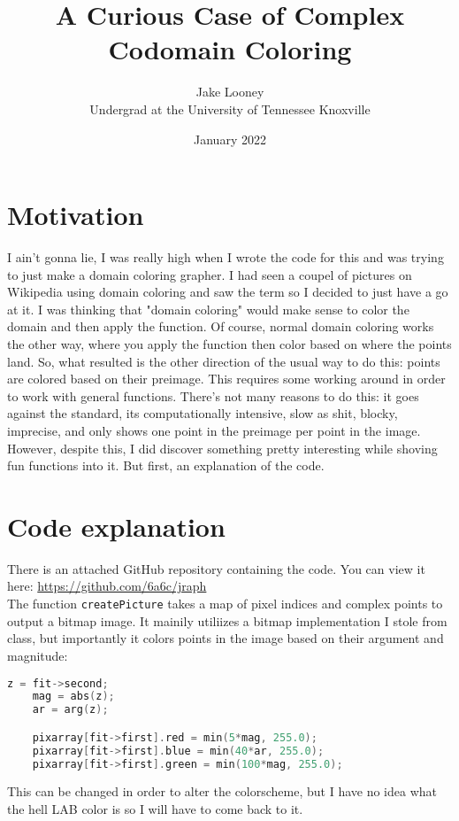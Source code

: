 \documentclass[letterpaper,12pt]{article}
\begin{document}
\title{A Curious Case of Complex Codomain Coloring}
\author{Jake Looney\\ Undergrad at the University of Tennessee Knoxville}
\date{January 2022}
\maketitle

\tableofcontents
\newpage
{}

\section{Motivation}
I ain't gonna lie, I was really high when I wrote the code for this and was trying to just make a domain coloring grapher.
I had seen a coupel of pictures on Wikipedia using domain coloring and saw the term so I decided to just have a go at it.
I was thinking that "domain coloring" would make sense to color the domain and then apply the function.
Of course, normal domain coloring works the other way, where you apply the function then color based on where the points land.
So, what resulted is the other direction of the usual way to do this: points are colored based on their preimage.
This requires some working around in order to work with general functions.
There's not many reasons to do this: it goes against the standard, its computationally intensive, slow as shit, blocky, imprecise, and only shows one point in the preimage per point in the image.
However, despite this, I did discover something pretty interesting while shoving fun functions into it. But first, an explanation of the code.

\section{Code explanation}
There is an attached GitHub repository containing the code. You can view it here: \url{https://github.com/6a6c/jraph} \\

The function \verb|createPicture| takes a map of pixel indices and complex points to output a bitmap image.
It mainily utiliizes a bitmap implementation I stole from class, but importantly it colors points in the image based on their argument and magnitude:
\begin{lstlisting}[language=c++]
    z = fit->second;
    mag = abs(z);
    ar = arg(z);

    pixarray[fit->first].red = min(5*mag, 255.0);
    pixarray[fit->first].blue = min(40*ar, 255.0);
    pixarray[fit->first].green = min(100*mag, 255.0);
\end{lstlisting}
This can be changed in order to alter the colorscheme, but I have no idea what the hell LAB color is so I will have to come back to it.\\
\end{document}

